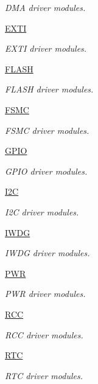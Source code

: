 \begin{DoxyCompactItemize}
\begin{DoxyCompactList}\small\item\em D\+MA driver modules. \end{DoxyCompactList}\item 
\hyperlink{group___e_x_t_i}{E\+X\+TI}
\begin{DoxyCompactList}\small\item\em E\+X\+TI driver modules. \end{DoxyCompactList}\item 
\hyperlink{group___f_l_a_s_h}{F\+L\+A\+SH}
\begin{DoxyCompactList}\small\item\em F\+L\+A\+SH driver modules. \end{DoxyCompactList}\item 
\hyperlink{group___f_s_m_c}{F\+S\+MC}
\begin{DoxyCompactList}\small\item\em F\+S\+MC driver modules. \end{DoxyCompactList}\item 
\hyperlink{group___g_p_i_o}{G\+P\+IO}
\begin{DoxyCompactList}\small\item\em G\+P\+IO driver modules. \end{DoxyCompactList}\item 
\hyperlink{group___i2_c}{I2C}
\begin{DoxyCompactList}\small\item\em I2C driver modules. \end{DoxyCompactList}\item 
\hyperlink{group___i_w_d_g}{I\+W\+DG}
\begin{DoxyCompactList}\small\item\em I\+W\+DG driver modules. \end{DoxyCompactList}\item 
\hyperlink{group___p_w_r}{P\+WR}
\begin{DoxyCompactList}\small\item\em P\+WR driver modules. \end{DoxyCompactList}\item 
\hyperlink{group___r_c_c}{R\+CC}
\begin{DoxyCompactList}\small\item\em R\+CC driver modules. \end{DoxyCompactList}\item 
\hyperlink{group___r_t_c}{R\+TC}
\begin{DoxyCompactList}\small\item\em R\+TC driver modules. \end{DoxyCompactList}\item 

\end{DoxyCompactItemize}
